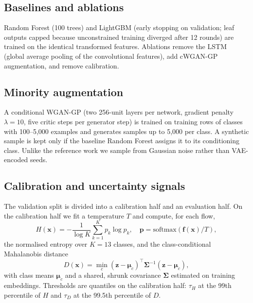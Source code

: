 \documentclass[conference]{IEEEtran}
\begin{document}
\subsection{Baselines and ablations}
Random Forest (100 trees) and LightGBM (early stopping on validation; leaf outputs capped because
unconstrained training diverged after 12 rounds) are trained on the identical transformed
features. Ablations remove the LSTM (global average pooling of the convolutional features),
add cWGAN-GP augmentation, and remove calibration.

\subsection{Minority augmentation}
A conditional WGAN-GP \cite{mirza2014conditional,gulrajani2017improved} (two 256-unit layers per
network, gradient penalty $\lambda=10$, five critic steps per generator step) is trained on
training rows of classes with 100--5,000 examples and generates samples up to 5,000 per class.
A synthetic sample is kept only if the baseline Random Forest assigns it to its conditioning
class. Unlike the reference work we sample from Gaussian noise rather than VAE-encoded seeds.

\subsection{Calibration and uncertainty signals}
The validation split is divided into a calibration half and an evaluation half. On the
calibration half we fit a temperature $T$ \cite{guo2017calibration} and compute, for each flow,
\begin{equation}
H(\mathbf{x}) = -\frac{1}{\log K}\sum_{k=1}^{K} p_k \log p_k, \quad
\mathbf{p} = \mathrm{softmax}(\mathbf{f}(\mathbf{x})/T),
\end{equation}
the normalised entropy over $K=13$ classes, and the class-conditional Mahalanobis distance
\cite{lee2018simple}
\begin{equation}
D(\mathbf{x}) = \min_{c} (\mathbf{z}-\boldsymbol{\mu}_c)^\top \boldsymbol{\Sigma}^{-1} (\mathbf{z}-\boldsymbol{\mu}_c),
\end{equation}
with class means $\boldsymbol{\mu}_c$ and a shared, shrunk covariance $\boldsymbol{\Sigma}$
estimated on training embeddings. Thresholds are quantiles on the calibration half: $\tau_H$ at
the 99th percentile of $H$ and $\tau_D$ at the 99.5th percentile of $D$.
\end{document}
